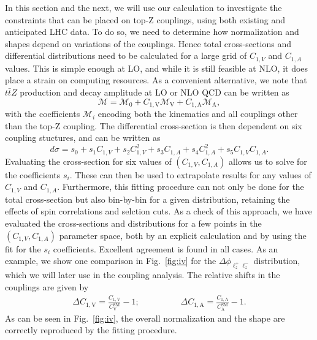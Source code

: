 \documentclass[preprint]{JHEP3} %
\newcommand{\mrm}{\mathrm}
\def\ttbZ{t\bar{t}Z}
\def\ConeA{C_{1,\mathrm{A}}}
\def\ConeV{C_{1,\mathrm{V}}}
\def\ConeVSM{C_\mathrm{V}^{\mrm{SM}}}
\def\ConeASM{C_\mathrm{A}^{\mrm{SM}}}
\def\DConeA{\Delta C_{1,\mathrm{A}}}
\def\DConeV{\Delta C_{1,\mathrm{V}}}
\newcommand{\be}{\begin{eqnarray}}
\newcommand{\ee}{\end{eqnarray}}
\begin{document}
In this section and the next, we will use our calculation to investigate the constraints that can be placed on top-Z couplings, using both existing and anticipated LHC data. 
To do so, we need to determine how normalization and shapes depend on variations of the couplings. 
Hence total cross-sections and differential distributions need to be calculated for a large grid of $C_{1,V}$ and $C_{1,A}$ values. 
This is simple enough at LO, and while it is still feasible at NLO, it does place a strain on computing resources. 
As a convenient alternative, we note that $\ttbZ$ production and decay amplitude at LO or NLO QCD can be written as
\begin{equation}
  \mathcal{M} = \mathcal{M}_0 +  \ConeV \mathcal{M}_\mathrm{V} +  \ConeA \mathcal{M}_\mathrm{A},
\end{equation}
with the coefficients $\mathcal{M}_i$ encoding both the kinematics and all couplings other than the top-Z coupling. 
The differential cross-section is then dependent on six coupling stuctures, and can be written as
\begin{equation}
\label{couplfit}
  d\sigma = s_0 +s_1C_{1,V} + s_2C_{1,V}^2 +s_3 C_{1,A}+s_4C_{1,A}^2+s_5C_{1,V}C_{1,A}.
\end{equation}
Evaluating the cross-section for six values of $(C_{1,V},C_{1,A})$ allows us to solve for the coefficients $s_i$. 
These can then be used to extrapolate results for any values of $C_{1,V}$ and $C_{1,A}$. 
Furthermore, this fitting procedure can not only be done for the total cross-section but also bin-by-bin for a given distribution, 
retaining the effects of spin correlations and selction cuts.
As a check of this approach, we have evaluated the cross-sections and distributions for a few points in the $(C_{1,V},C_{1,A})$ parameter space, 
both by an explicit calculation and by using the fit for the $s_i$ coefficients. Excellent agreement is found in all cases. 
As an example, we show one comparison in Fig.~\ref{fig:iv} for the  $\Delta \phi_{\ell^+_z \ell^-_z}$ distribution, which we will later use in the coupling analysis.
The relative shifts in the couplings are given by
\be
\DConeV =  \frac{\ConeV}{\ConeVSM}-1 ; \hspace{2cm} \DConeA = \frac{\ConeA}{\ConeASM}-1.
\ee
As can be seen in Fig.~\ref{fig:iv}, the overall normalization and the shape are correctly reproduced by the fitting procedure.
\end{document}
